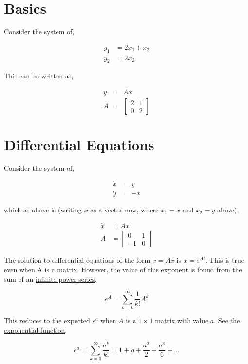 \documentclass{article}
\begin{document}
\noindent{}

\section{Basics}

Consider the system of,

\begin{align}
    y_1 &= 2x_1 + x_2 \\
    y_2 &= 2x_2
\end{align}

\noindent This can be written as,

\begin{align}
    y &= Ax \\
    A &=
    \begin{bmatrix}
        2 & 1 \\
        0 & 2
    \end{bmatrix}
\end{align}

\section{Differential Equations}

Consider the system of,

\begin{align}
    \dot{x} &= y \\
    \dot{y} &= -x
\end{align}

\noindent which as above is (writing $x$ as a vector now, where $x_1 = x$ and $x_2 = y$ above),

\begin{align}
    \dot{x} &= Ax \\
    A &=
    \begin{bmatrix}
        0 & 1 \\
        -1 & 0
    \end{bmatrix}
\end{align}

\noindent The solution to differential equations of the form $\dot{x} = Ax$ is $x = e^{At}$.
This is true even when A is a matrix. However, the value of this exponent is found from the sum of an \href{https://en.wikipedia.org/wiki/Matrix_exponential}{infinite power series}.

\begin{equation}
    e^A = \sum_{k=0}^{\infty} \frac{1}{k!} A^k
\end{equation}

\noindent This reduces to the expected $e^a$ when $A$ is a $1 \times 1$ matrix with value $a$. See the \href{https://en.wikipedia.org/wiki/Exponential_function#Formal_definition}{exponential function}.

\begin{equation}
    e^a = \sum_{k=0}^{\infty} \frac{a^k}{k!} = 1 + a + \frac{a^2}{2} + \frac{a^3}{6} + \ldots{}
\end{equation}
\end{document}
